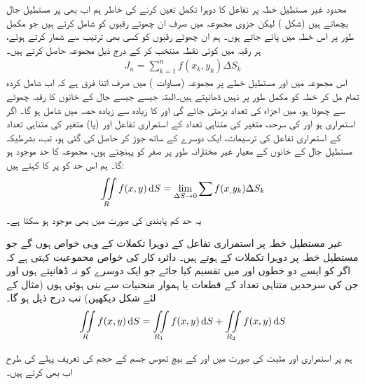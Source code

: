 محدود غیر مستطیل خطہ پر تفاعل   کا دوہرا تکمل تعین کرنے کی خاطر  ہم اب بھی  پر مستطیل جال بچھاتے ہیں (شکل )    لیکن جزوی مجموعہ میں صرف ان چھوٹے رقبوں  کو شامل کرتے ہیں جو مکمل طور پر اس خطہ میں پائے جاتے ہوں۔ ہم ان چھوٹے رقبوں کو کسی بھی  ترتیب سے شمار کرتے  ہوئے، ہر رقبہ  میں کوئی نقطہ  منتخب کر کے   درج ذیل مجموعہ حاصل کرتے ہیں۔
\begin{align*}
J_n=\sum_{k=1}^n f(x_k,y_k)\Delta S_k
\end{align*}
اس مجموعہ میں اور مستطیل خطے  پر مجموعہ (مساوات )  میں صرف اتنا فرق ہے کہ  اب شامل کردہ تمام  مل کر خطہ  کو  مکمل طور پر نہیں ڈھانپتے ہیں۔البتہ جیسے جیسے جال کے  خانوں کا رقبہ چھوٹے سے چھوٹا ہو،   میں  اجزاء کی تعداد بڑھتی جائے گی  اور  کا زیادہ سے زیادہ حصہ   میں شامل ہو گا۔ اگر  استمراری ہو اور  کی سرحد،     متغیر  کی  متناہی تعداد کے  استمراری تفاعل اور (یا) متغیر  کی  متناہی تعداد کے استمراری تفاعل کی ترسیمات،  ایک دوسرے کے ساتھ جوڑ کر حاصل کی گئی ہو، تب، بشرطیکہ  مستطیل جال کے خانوں کے   معیار  غیر  مختارانہ  طور پر صفر کو پہنچتے ہوں،  مجموعہ  کا حد موجود  ہو گا۔ ہم اس حد کو  پر  کا  کہتے ہیں:
\begin{align*}
\iint\limits_R f(x,y)\dif S=\lim_{\Delta S\to 0}\sum f(x_,y_k)\Delta S_k
\end{align*}
یہ حد کم  پابندی کی صورت میں بھی موجود ہو سکتا ہے۔

غیر مستطیل خطہ پر استمراری  تفاعل کے دوہرا تکملات کے وہی خواص ہوں گے جو مستطیل خطہ پر  دوہرا تکملات کے ہوتے ہیں۔ دائرہ کار کی  خواص مجموعیت  کہتی ہے کہ اگر  کو ایسے   دو  خطوں   اور  میں تقسیم کیا جائے جو ایک دوسرے کو نہ ڈھانپتے   ہوں  اور  جن کی سرحدیں  متناہی تعداد کے قطعات یا ہموار منحنیات  سے بنی ہوئی  ہوں (مثال کے لئے  شکل  دیکھیں)        تب  درج ذیل ہو گا۔
\begin{align*}
\iint\limits_R f(x,y)\dif S=\iint\limits_{R_1}f(x,y)\dif S+\iint\limits_{R_2}f(x,y)\dif S
\end{align*}

ہم   پر استمراری اور مثبت   کی صورت میں   اور  کے بیچ ٹھوس جسم کے حجم  کی تعریف پہلے کی طرح اب بھی    کرتے ہیں۔



